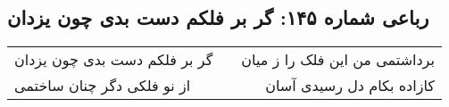 \begin{center}
\section*{رباعی شماره ۱۴۵: گر بر فلکم دست بدی چون یزدان}
\label{sec:sh145}
\begin{longtable}{l p{0.5cm} r}
گر بر فلکم دست بدی چون یزدان
&&
برداشتمی من این فلک را ز میان
\\
از نو فلکی دگر چنان ساختمی
&&
کازاده بکام دل رسیدی آسان
\\
\end{longtable}
\end{center}
